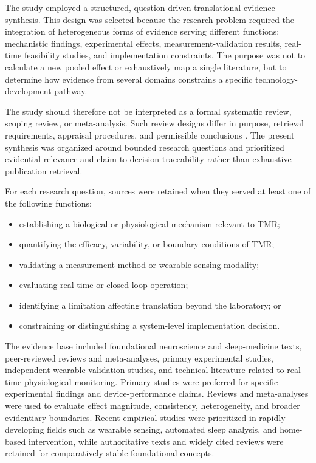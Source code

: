 The study employed a structured, question-driven translational evidence
synthesis. This design was selected because the research problem required the
integration of heterogeneous forms of evidence serving different functions:
mechanistic findings, experimental effects, measurement-validation results,
real-time feasibility studies, and implementation constraints. The purpose was
not to calculate a new pooled effect or exhaustively map a single literature,
but to determine how evidence from several domains constrains a specific
technology-development pathway.

The study should therefore not be interpreted as a formal systematic review,
scoping review, or meta-analysis. Such review designs differ in purpose,
retrieval requirements, appraisal procedures, and permissible conclusions
\citep{grant2009typology,snyder2019literature}. The present synthesis was
organized around bounded research questions and prioritized evidential relevance
and claim-to-decision traceability rather than exhaustive publication retrieval.

For each research question, sources were retained when they served at least one
of the following functions:

\begin{itemize}
    \item establishing a biological or physiological mechanism relevant to TMR;
    \item quantifying the efficacy, variability, or boundary conditions of TMR;
    \item validating a measurement method or wearable sensing modality;
    \item evaluating real-time or closed-loop operation;
    \item identifying a limitation affecting translation beyond the laboratory;
    or
    \item constraining or distinguishing a system-level implementation decision.
\end{itemize}

The evidence base included foundational neuroscience and sleep-medicine texts,
peer-reviewed reviews and meta-analyses, primary experimental studies,
independent wearable-validation studies, and technical literature related to
real-time physiological monitoring. Primary studies were preferred for specific
experimental findings and device-performance claims. Reviews and
meta-analyses were used to evaluate effect magnitude, consistency,
heterogeneity, and broader evidentiary boundaries. Recent empirical studies were
prioritized in rapidly developing fields such as wearable sensing, automated
sleep analysis, and home-based intervention, while authoritative texts and
widely cited reviews were retained for comparatively stable foundational
concepts.

